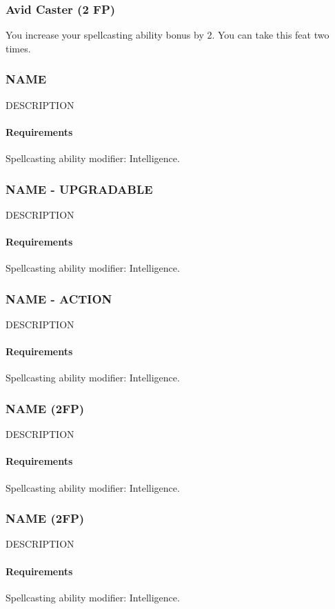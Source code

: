 \subsubsection{Avid Caster (2 FP)} \label{feat::avidcaster}
    You increase your spellcasting ability bonus by 2.
    You can take this feat two times.

\subsubsection{NAME} \label{feat::name}
    DESCRIPTION
    \paragraph{Requirements} Spellcasting ability modifier: Intelligence.
\subsubsection{NAME - UPGRADABLE} \label{feat::name}
    DESCRIPTION
    \paragraph{Requirements} Spellcasting ability modifier: Intelligence.
\subsubsection{NAME - ACTION} \label{feat::name}
    DESCRIPTION
    \paragraph{Requirements} Spellcasting ability modifier: Intelligence.
\subsubsection{NAME (2FP)} \label{feat::name}
    DESCRIPTION
    \paragraph{Requirements} Spellcasting ability modifier: Intelligence.
\subsubsection{NAME (2FP)} \label{feat::name}
    DESCRIPTION
    \paragraph{Requirements} Spellcasting ability modifier: Intelligence.

